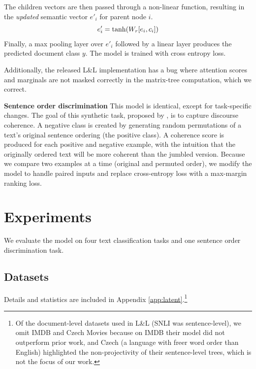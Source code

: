 The children vectors are then passed through a non-linear function, resulting in the \emph{updated} semantic vector $e'_i$ for parent node $i$.
\vspace{-0.7em}
\begin{equation}
\label{eq:update}
e'_i = \tanh(W_r[e_i, c_i])
\vspace{-0.7em}
\end{equation}
Finally, a max pooling layer over $e'_i$ followed by a linear layer produces the predicted document class $y$. The model is trained with cross entropy loss.

Additionally, the released L\&L implementation has a bug where attention scores and marginals are not masked correctly in the matrix-tree computation, which we correct.

\smallskip
\noindent \textbf{Sentence order discrimination} This model is identical, except for task-specific changes. The goal of this synthetic task, proposed by \citet{Barzilay:2008}, is to capture discourse coherence. A negative class is created by generating 
random permutations of a text's original sentence ordering (the positive class). A coherence score is produced for each positive and negative example, with the intuition that the originally ordered text will be more coherent than the jumbled version. Because we compare two examples at a time (original and permuted order), we modify the model to handle paired inputs and replace cross-entropy loss with a max-margin ranking loss.

\section{Experiments}
We evaluate the model on four text classification tasks and one sentence order discrimination task. 

\subsection{Datasets}
Details and statistics are included in Appendix \ref{app:latent}.\footnote{Of the document-level datasets used in L\&L (SNLI was sentence-level), we omit IMDB and Czech Movies because on IMDB their model did not outperform prior work, and Czech (a language with freer word order than English) highlighted the non-projectivity of their sentence-level trees, which is not the focus of our work.}

